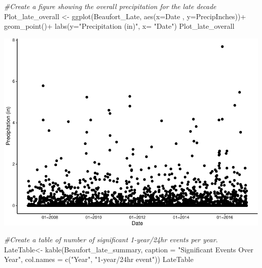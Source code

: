 \documentclass[
  12pt,
]{article}
\newenvironment{Shaded}{\begin{snugshade}}{\end{snugshade}}
\newcommand{\AttributeTok}[1]{\textcolor[rgb]{0.77,0.63,0.00}{#1}}
\newcommand{\CommentTok}[1]{\textcolor[rgb]{0.56,0.35,0.01}{\textit{#1}}}
\newcommand{\FunctionTok}[1]{\textcolor[rgb]{0.00,0.00,0.00}{#1}}
\newcommand{\NormalTok}[1]{#1}
\newcommand{\OtherTok}[1]{\textcolor[rgb]{0.56,0.35,0.01}{#1}}
\newcommand{\SpecialCharTok}[1]{\textcolor[rgb]{0.00,0.00,0.00}{#1}}
\newcommand{\StringTok}[1]{\textcolor[rgb]{0.31,0.60,0.02}{#1}}
\begin{document}
\begin{Shaded}
\begin{Highlighting}[]
\CommentTok{\#Create a figure showing the overall precipitation for the late decade}
\NormalTok{Plot\_late\_overall }\OtherTok{\textless{}{-}} \FunctionTok{ggplot}\NormalTok{(Beaufort\_Late, }
                            \FunctionTok{aes}\NormalTok{(}\AttributeTok{x=}\NormalTok{Date , }\AttributeTok{y=}\NormalTok{PrecipInches))}\SpecialCharTok{+}
  \FunctionTok{geom\_point}\NormalTok{()}\SpecialCharTok{+}
  \FunctionTok{labs}\NormalTok{(}\AttributeTok{y=}\StringTok{"Precipitation (in)"}\NormalTok{, }\AttributeTok{x=} \StringTok{"Date"}\NormalTok{)}
\NormalTok{Plot\_late\_overall}
\end{Highlighting}
\end{Shaded}

\includegraphics{Final_Project_Thornton_Katayama_Ngenzi_files/figure-latex/late plot 2-1.pdf}
\newpage

\begin{Shaded}
\begin{Highlighting}[]
\CommentTok{\#Create a table of number of significant 1{-}year/24hr events per year.}
\NormalTok{LateTable}\OtherTok{\textless{}{-}} \FunctionTok{kable}\NormalTok{(Beaufort\_late\_summary, }
                  \AttributeTok{caption =} \StringTok{"Significant Events Over Year"}\NormalTok{, }
                  \AttributeTok{col.names =} \FunctionTok{c}\NormalTok{(}\StringTok{"Year"}\NormalTok{, }\StringTok{"1{-}year/24hr event"}\NormalTok{))}
\NormalTok{LateTable}
\end{Highlighting}
\end{Shaded}
\end{document}
